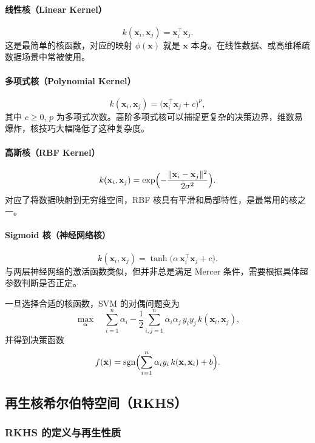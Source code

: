\documentclass[11pt]{article}
\begin{document}
\begin{CJK}{UTF8}{gbsn}
\paragraph{线性核（Linear Kernel）}
\[
k(\mathbf{x}_i, \mathbf{x}_j) = \mathbf{x}_i^\top \mathbf{x}_j.
\]
这是最简单的核函数，对应的映射 \(\phi(\mathbf{x})\) 就是 \(\mathbf{x}\) 本身。在线性数据、或高维稀疏数据场景中常被使用。

\paragraph{多项式核（Polynomial Kernel）}
\[
k(\mathbf{x}_i, \mathbf{x}_j) 
= \bigl(\mathbf{x}_i^\top \mathbf{x}_j + c\bigr)^p,
\]
其中 \(c \ge 0\), \(p\) 为多项式次数。高阶多项式核可以捕捉更复杂的决策边界，维数易爆炸，核技巧大幅降低了这种复杂度。

\paragraph{高斯核（RBF Kernel）}
\[
k(\mathbf{x}_i, \mathbf{x}_j) 
= \exp\Bigl(-\frac{\|\mathbf{x}_i - \mathbf{x}_j\|^2}{2\sigma^2}\Bigr).
\]
对应了将数据映射到无穷维空间，RBF 核具有平滑和局部特性，是最常用的核之一。

\paragraph{Sigmoid 核（神经网络核）}
\[
k(\mathbf{x}_i, \mathbf{x}_j) 
= \tanh\bigl(\alpha \,\mathbf{x}_i^\top \mathbf{x}_j + c\bigr).
\]
与两层神经网络的激活函数类似，但并非总是满足 Mercer 条件，需要根据具体超参数判断是否正定。

一旦选择合适的核函数，SVM 的对偶问题变为
\[
\max_{\boldsymbol{\alpha}} \quad \sum_{i=1}^n \alpha_i 
- \frac{1}{2}\sum_{i,j=1}^n \alpha_i \alpha_j\,y_i y_j\, k(\mathbf{x}_i, \mathbf{x}_j),
\]
并得到决策函数
\[
f(\mathbf{x}) 
= \text{sgn}\Bigl(\sum_{i=1}^n \alpha_i y_i\,k(\mathbf{x}, \mathbf{x}_i) + b\Bigr).
\]

\subsection{再生核希尔伯特空间（RKHS）}
\label{subsec:rkhs}

\subsubsection{RKHS 的定义与再生性质}


\end{CJK}
\end{document}
